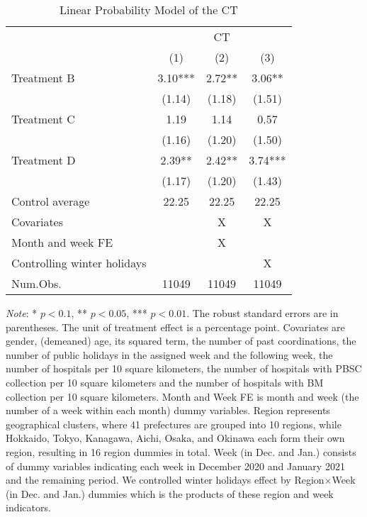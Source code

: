 \documentclass[12pt, a4paper]{article}
\begin{document}
\begin{table}[H]

\caption{\label{tab:test-lm}Linear Probability Model of the CT}
\centering
\fontsize{8}{10}\selectfont
\begin{threeparttable}
\begin{tabular}[t]{lccc}
\toprule
\multicolumn{1}{c}{ } & \multicolumn{3}{c}{CT} \\
\cmidrule(l{3pt}r{3pt}){2-4}
  & (1) & (2) & (3)\\
\midrule
Treatment B & \num{3.10}*** & \num{2.72}** & \num{3.06}**\\
 & (\num{1.14}) & (\num{1.18}) & (\num{1.51})\\
Treatment C & \num{1.19} & \num{1.14} & \num{0.57}\\
 & (\num{1.16}) & (\num{1.20}) & (\num{1.50})\\
Treatment D & \num{2.39}** & \num{2.42}** & \num{3.74}***\\
 & (\num{1.17}) & (\num{1.20}) & (\num{1.43})\\
\midrule
Control average & 22.25 & 22.25 & 22.25\\
Covariates &  & X & X\\
Month and week FE &  & X & \\
Controlling winter holidays &  &  & X\\
Num.Obs. & \num{11049} & \num{11049} & \num{11049}\\
\bottomrule
\end{tabular}
\begin{tablenotes}
\item \emph{Note}: * $p < 0.1$, ** $p < 0.05$, *** $p < 0.01$. The robust standard errors are in parentheses. The unit of treatment effect is a percentage point. Covariates are gender, (demeaned) age, its squared term, the number of past coordinations, the number of public holidays in the assigned week and the following week, the number of hospitals per 10 square kilometers, the number of hospitals with PBSC collection per 10 square kilometers and the number of hospitals with BM collection per 10 square kilometers. Month and Week FE is month and week (the number of a week within each month) dummy variables. Region represents geographical clusters, where 41 prefectures are grouped into 10 regions, while Hokkaido, Tokyo, Kanagawa, Aichi, Osaka, and Okinawa each form their own region, resulting in 16 region dummies in total. Week (in Dec. and Jan.) consists of dummy variables indicating each week in December 2020 and January 2021 and the remaining period. We controlled winter holidays effect by Region$\times$Week (in Dec. and Jan.) dummies which is the products of these region and week indicators.
\end{tablenotes}
\end{threeparttable}
\end{table}
\end{document}
